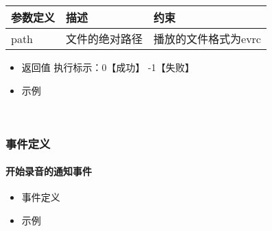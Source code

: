 \documentclass[letterpaper,10pt,english]{sphinxmanual}
\begin{document}
\begin{savenotes}\sphinxattablestart
\centering
\begin{tabulary}{\linewidth}[t]{|T|T|T|}
\hline
\sphinxstyletheadfamily 
参数定义
&\sphinxstyletheadfamily 
描述
&\sphinxstyletheadfamily 
约束
\\
\hline
path
&
文件的绝对路径
&
播放的文件格式为evrc
\\
\hline
\end{tabulary}
\par
\sphinxattableend\end{savenotes}
\begin{itemize}
\item {} 
返回值 执行标示：0【成功】 -1【失败】

\item {} 
示例

\end{itemize}

%
\begin{sphinxVerbatim}[commandchars=\\\{\}]
   
\end{sphinxVerbatim}

​


\subsubsection{事件定义}
\label{\detokenize{csharp:id81}}

\paragraph{开始录音的通知事件}
\label{\detokenize{csharp:id82}}\begin{itemize}
\item {} 
事件定义

\end{itemize}

%
\begin{sphinxVerbatim}[commandchars=\\\{\}]
   
\end{sphinxVerbatim}
\begin{itemize}
\item {} 
示例

\end{itemize}
\end{document}
